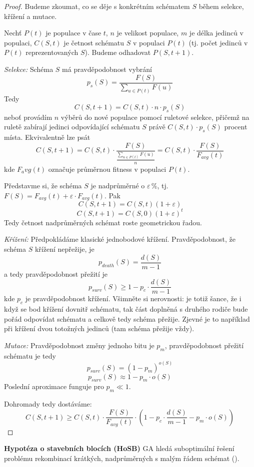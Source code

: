 \begin{proof} Budeme zkoumat, co se děje s konkrétním schématem $S$ během selekce, křížení a mutace.

Nechť $P(t)$ je populace v čase $t$, $n$ je velikost populace, $m$ je délka jedinců v populaci, $C(S,t)$ je četnost schématu $S$ v populaci $P(t)$ (tj. počet jedinců v $P(t)$ reprezentovaných $S$). Budeme odhadovat $P(S, t+1)$.

\textit{Selekce:} Schéma $S$ má pravděpodobnost vybrání
$$p_s(S) = \frac{F(S)}{\sum\limits_{u \in P(t)}F(u)}$$
Tedy 
$$C(S,t+1) = C(S,t) \cdot n \cdot p_s(S)$$
neboť provádím $n$ výběrů do nové populace pomocí ruletové selekce, přičemž na ruletě zabírají jedinci odpovídající schématu $S$ právě $C(S,t) \cdot p_s(S)$ procent místa. Ekvivalentně lze psát
$$C(S,t+1) = C(S,t) \cdot \frac{F(S)}{\frac{\sum_{u \in P(t)}F(u)}{n}} = C(S,t) \cdot \frac{F(S)}{F_{avg}(t)}$$
kde $F_avg(t)$ označuje průměrnou fitness v populaci $P(t)$. 

Představme si, že schéma $S$ je nadprůměrné o $\varepsilon$\,\%, tj. $F(S) = F_{avg}(t) + \varepsilon\cdot F_{avg}(t)$. Pak 
$$C(S,t+1) = C(S,t)(1+\varepsilon)$$
$$C(S,t+1) = C(S,0)(1+\varepsilon)^t$$
Tedy četnost nadprůměrných schémat roste geometrickou řadou.

\textit{Křížení:} Předpokládáme klasické jednobodové křížení. Pravděpodobnost, že schéma $S$ křížení nepřežije, je 
$$p_{death}(S) = \frac{d(S)}{m-1}$$
a tedy pravděpodobnost přežití je 
$$p_{surv}(S) \geq 1 - p_c \cdot \frac{d(S)}{m-1}$$
kde $p_c$ je pravděpodobnost křížení. Všimněte si nerovnosti: je totiž šance, že i když se bod křížení  dovnitř schématu, tak část doplněná s druhého rodiče bude pořád odpovídat schématu a celkově tedy schéma přežije. Zjevné je to například při křížení dvou totožných jedinců (tam schéma přežije vždy).

\textit{Mutace:} Pravděpodobnost změny jednoho bitu je $p_m$, pravděpodobnost přežití schématu je tedy 
$$p_{surv}(S) = (1-p_m)^{o(S)}$$
$$p_{surv}(S) \approx 1 - p_m \cdot o(S)$$
Poslední aproximace funguje pro $p_m \ll 1$.

Dohromady tedy dostáváme:
$$C(S,t+1) \geq C(S,t) \cdot \frac{F(S)}{F_{avg}(t)} \cdot \left(1 - p_c \cdot \frac{d(S)}{m-1} - p_m \cdot o(S)\right)$$
\end{proof}

\textbf{Hypotéza o stavebních blocích (HoSB)} GA hledá suboptimální řešení problému rekombinací krátkých, nadprůměrných s malým řádem schémat ().

